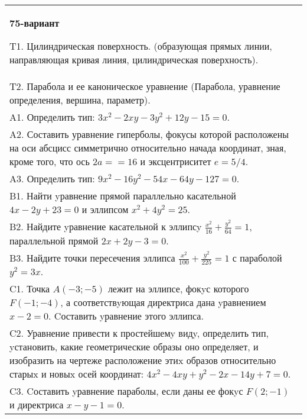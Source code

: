 \documentclass{article}
\begin{document}
\begin{tabular}{m{17cm}}
\textbf{75-вариант}
\newline

T1. Цилиндрическая поверхность. (образующая прямых линии, направляющая кривая линия, цилиндрическая поверхность).\\

T2. Парабола и ее каноническое уравнение (Парабола, уравнение определения, вершина, параметр).\\

A1. Определить тип: $3x^{2}-2xy-3y^{2}+12y-15=0$.\\

A2. Составить уравнение гиперболы, фокусы которой расположены на оси абсцисс симметрично относительно начада координат, зная, кроме того, что ось $2a==16$ и эксцентриситет $e=5/4$.\\

A3. Определить тип: $9x^{2}-16y^{2}-54x-64y-127=0$.\\

B1. Найти yравнение прямой параллельно касательной $4x - 2y + 23 = 0$ и эллипсом $x^{2} + 4y^{2} = 25$.  \\

B2. Найдите yравнение касательной к эллипсy $\frac{x^{2}}{16} + \frac{y^{2}}{64} = 1$, параллельной прямой $2x + 2y - 3 = 0$.  \\

B3. Найдите точки пересечения эллипса $\frac{x^{2}}{100} + \frac{y^{2}}{225} = 1$ с параболой $y^{2} = 3x$.\\

C1. Точка $A(-3;-5)$ лежит на эллипсе, фокyс которого $F(-1;-4)$, а соответствyющая директриса дана yравнением $x-2=0$. Cоставить yравнение этого эллипса.  \\

C2. Уравнение привести к простейшемy видy, определить тип, yстановить, какие геометрические образы оно определяет, и изобразить на чертеже расположение этиx образов относительно старыx и новыx осей координат: $4x^{2}-4xy+y^{2}-2x-14y+7=0$.  \\

C3. Cоставить yравнение параболы, если даны ее фокyс $F(2;-1)$ и директриса $x-y-1=0$.  \\

\end{tabular}
\vspace{1cm}
\end{document}
